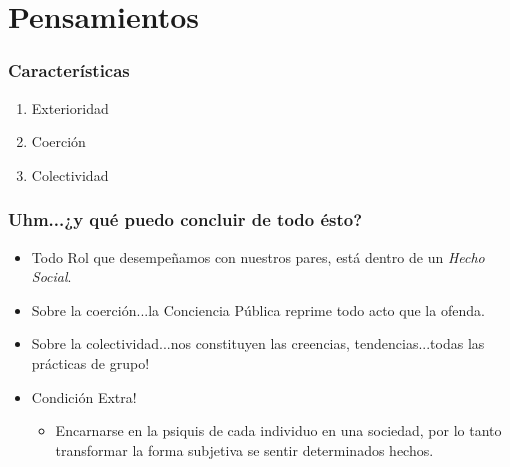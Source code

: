 \documentclass{beamer}
\begin{document}
\section{Pensamientos}
\frame
{
\frametitle{Características}
	\begin{enumerate}
		\item Exterioridad
		\item Coerción
		\item Colectividad
	\end{enumerate}
}
\frame
{
\frametitle{Uhm...¿y qué puedo concluir de todo ésto?}
\begin{itemize}
	\item Todo Rol que desempeñamos con nuestros pares, está dentro de un \emph{Hecho Social}.
	\item Sobre la coerción...la Conciencia Pública reprime todo acto que la ofenda.
	\item Sobre la colectividad...nos constituyen las creencias, tendencias...todas las prácticas de grupo!
	\item Condición Extra!
	\begin{itemize}
		\item Encarnarse en la psiquis de cada individuo en una sociedad, por lo tanto transformar la forma
		subjetiva se sentir determinados hechos.
	\end{itemize}
\end{itemize}
}
\end{document}
